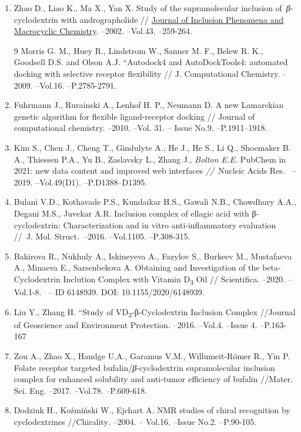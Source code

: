 \begin{enumerate}
\item
Zhao D., Liao K., Ma X., Yan X. Study of the supramolecular inclusion
of~\emph{β}-cyclodextrin with andrographolide //
\href{https://link.springer.com/journal/10847}{Journal of Inclusion
Phenomena and Macrocyclic Chemistry}. --2002. --Vol.43. --259-264.

9 Morris G. M., Huey R., Lindstrom W., Sanner M. F., Belew R. K.,
Goodsell D.S. and Olson A.J. ``Autodock4 and AutoDockTools4: automated
docking with selective receptor flexibility // J. Computational
Chemistry. --2009. --Vol.16. --P.2785-2791.

\item
Fuhrmann J., Rurainski A., Lenhof H. P., Neumann D. A new Lamarckian
genetic algorithm for flexible ligand-receptor docking // Journal of
computational chemistry. --2010. --Vol. 31. -- Issue No.9.
--P.1911--1918.

\item
Kim S., Chen J., Cheng T., Gindulyte A., He J., He S., Li Q.,
Shoemaker B. A., Thiessen P.A., Yu B., Zaslavsky L., Zhang J.,
\emph{Bolton E.E.} PubChem in 2021: new data content and improved web
interfaces \emph{//~}Nucleic Acids Res.~ --2019. --Vol.49(D1).
--P.D1388--D1395.

\item
Bulani V.D., Kothavade P.S., Kundaikar H.S., Gawali N.B., Chowdhury
A.A., Degani M.S., Juvekar A.R. Inclusion complex of ellagic acid with
β-cyclodextrin: Characterization and in vitro anti-inflammatory
evaluation //~J. Mol. Struct\emph{.}~--2016. --Vol.1105. --P.308-315.

\item
Bakirova R., Nukhuly A., Iskineyeva A., Fazylov S., Burkeev M.,
Mustafaeva A., Minaeva E., Sarsenbekova A. Obtaining and Investigation
of the beta-Cyclodextrin Inclution Complex with Vitamin
D\textsubscript{3} Oil // Scientifica. --2020. --Vol.1-8. ~-- ID
6148939. DOI: 10.1155/2020/6148939.

\item
Liu Y., Zhang H. ``Study of VD\textsubscript{3}-β-Cyclodextrin
Inclusion Complex //Journal of Geoscience and Environment
Protection\emph{.} --2016. --Vol.4. --Issue 4. --P.163-167

\item
Zou A., Zhao X., Handge U.A., Garamus V.M., Willumeit-Römer R., Yin
P. Folate receptor targeted bufalin/\emph{β}-cyclodextrin supramolecular
inclusion complex for enhanced solubility and anti-tumor efficiency of
bufalin //Mater. Sci. Eng. --2017. --Vol.78. --P.609-618.

\item
Dodziuk H., Koźmiński W., Ejchart A. NMR studies of chiral
recognition by cyclodextrines //Chirality\emph{.} --2004. -- Vol.16.
--Issue No.2. --P.90-105.
\end{enumerate}

